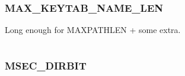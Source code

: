 \documentclass[letterpaper,10pt,english]{sphinxmanual}
\begin{document}
\begin{fulllineitems}
\label{appdev/refs/macros/LR_TYPE_THIS_SERVER_ONLY:LR_TYPE_THIS_SERVER_ONLY}
\end{fulllineitems}


\begin{tabulary}{\linewidth}{|L|L|}
\hline

 & 
\\
\hline\end{tabulary}



\subsubsection{MAX\_KEYTAB\_NAME\_LEN}
\label{appdev/refs/macros/MAX_KEYTAB_NAME_LEN:max-keytab-name-len-data}\label{appdev/refs/macros/MAX_KEYTAB_NAME_LEN::doc}\label{appdev/refs/macros/MAX_KEYTAB_NAME_LEN:max-keytab-name-len}

\begin{fulllineitems}
\label{appdev/refs/macros/MAX_KEYTAB_NAME_LEN:MAX_KEYTAB_NAME_LEN}
\end{fulllineitems}


Long enough for MAXPATHLEN + some extra.

\begin{tabulary}{\linewidth}{|L|L|}
\hline

 & 
\\
\hline\end{tabulary}



\subsubsection{MSEC\_DIRBIT}
\label{appdev/refs/macros/MSEC_DIRBIT:msec-dirbit}\label{appdev/refs/macros/MSEC_DIRBIT:msec-dirbit-data}\label{appdev/refs/macros/MSEC_DIRBIT::doc}

\begin{fulllineitems}
\label{appdev/refs/macros/MSEC_DIRBIT:MSEC_DIRBIT}
\end{fulllineitems}


\begin{tabulary}{\linewidth}{|L|L|}
\hline

 & 
\\
\hline\end{tabulary}
\end{document}
